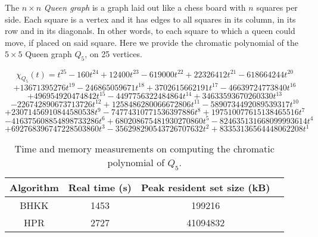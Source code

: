 \documentclass[a4paper]{article}
\begin{document}
The $n \times n$ \emph{Queen graph} is a graph laid out like a chess board with $n$ squares per side. Each square is a vertex and it has edges to all squares in its column, in its row and in its diagonals. In other words, to each square to which a queen could move, if placed on said square. Here we provide the chromatic polynomial of the $5 \times 5$ Queen graph $Q_5$, on 25 vertices.

\[
 \chi_{Q_5}(t) = 
 t^{25} -160t^{24} + 12400t^{23} -619000t^{22} + 22326412t^{21} -618664244t^{20}
 \]
 \[
 + 13671395276t^{19} -246865059671t^{18} + 3702615662191t^{17} -46639724773840t^{16}
 \]\[
 + 496954920474842t^{15} -4497756322484864t^{14} + 34633593670260330t^{13}
 \]\[
 -226742890673713726t^{12} + 1258486280066672806t^{11} -5890734492089539317t^{10}
 \]\[
 + 23071456910844580538t^9 -74774310771536397886t^8 + 197510077615138465516t^7
 \]\[
 -416375608854898733286t^6 + 680208675481930270860t^5 -824635131668099993614t^4
 \]\[
 + 692768396747228503860t^3 -356298290543726707632t^2 + 83353136564448062208t^1
\]

\begin{table}[H]\centering
\begin{tabular}{|c|c|c|c|} \hline
  Algorithm & Real time (s) & Peak resident set size (kB) \\ \hline
  BHKK & 1453 & 199216 \\ \hline
  HPR & 2727 & 41094832 \\ \hline
\end{tabular}
\caption{Time and memory measurements on computing the chromatic polynomial of $Q_5$.}
\end{table}




\end{document}
